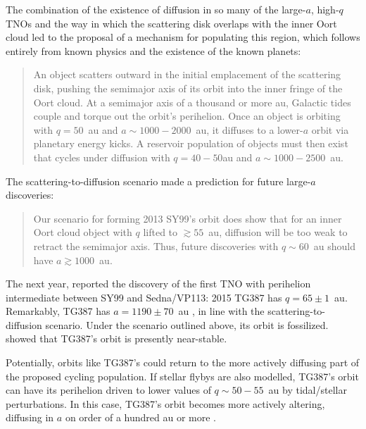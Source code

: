 \documentclass{aastex62}
\begin{document}
The combination of the existence of diffusion in so many of the large-$a$, high-$q$ TNOs and the way in which the scattering disk overlaps with the inner Oort cloud led \citet{bannister17} to the proposal of a mechanism for populating this region, which follows entirely from known physics and the existence of the known planets:
\begin{quote}
An object scatters outward in the initial emplacement of the scattering disk, pushing the semimajor axis of its orbit into the inner fringe of the Oort cloud. At a semimajor axis of a thousand or more au, Galactic tides couple and torque out the orbit's perihelion. Once an object is orbiting with $q = 50$~au and $a\sim1000-2000$~au, it diffuses to a lower-$a$ orbit via planetary energy kicks. A reservoir population of objects must then exist that cycles under diffusion with $q = 40-50$au and $a\sim1000-2500$~au.
\end{quote}
The scattering-to-diffusion scenario made a prediction for future large-$a$ discoveries: 
\begin{quote}
    Our scenario for forming 2013 SY99's orbit does show that for an inner Oort cloud object with $q$ lifted to $\gtrsim 55$~au, diffusion will be too weak to retract the semimajor axis. Thus, future discoveries with $q\sim60$~au should have $a \gtrsim 1000$~au.
\end{quote}
The next year, \citet{sheppard18} reported the discovery of the first TNO with perihelion intermediate between SY99 and Sedna/VP113: 2015 TG387 has $q=65 \pm 1$~au. 
Remarkably, TG387 has $a = 1190 \pm 70$~au \citep{sheppard18}, in line with the scattering-to-diffusion scenario.
Under the scenario outlined above, its orbit is fossilized. \citet{sheppard18} showed that TG387's orbit is presently near-stable. 

Potentially, orbits like TG387's could return to the more actively diffusing part of the proposed cycling population.
If stellar flybys are also modelled, TG387's orbit can have its perihelion driven to lower values of $q \sim 50-55$~au by tidal/stellar perturbations. In this case, TG387's orbit becomes more actively altering, diffusing in $a$ on order of a hundred au or more \citep{sheppard18}. 
\end{document}
